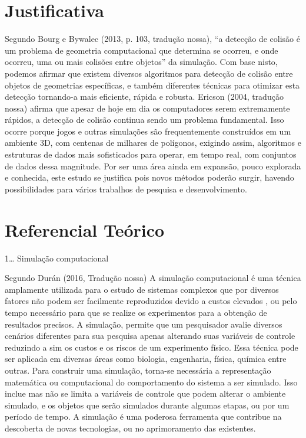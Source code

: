 \section{Justificativa}

Segundo Bourg e Bywalec (2013, p. 103, tradução nossa), “a detecção de colisão é um problema de geometria computacional que determina se ocorreu, e onde ocorreu, uma ou mais colisões entre objetos” da simulação. Com base nisto, podemos afirmar que existem diversos algoritmos para detecção de colisão entre objetos de geometrias específicas, e também diferentes técnicas para otimizar esta detecção tornando-a mais eficiente, rápida e robusta.
Ericson (2004, tradução nossa) afirma que apesar de hoje em dia os computadores serem extremamente rápidos, a detecção de colisão continua sendo um problema fundamental. Isso ocorre porque jogos e outras simulações são frequentemente construídos em um ambiente 3D, com centenas de milhares de polígonos, exigindo assim, algoritmos e estruturas de dados mais sofisticados para operar, em tempo real, com conjuntos de dados dessa magnitude.
Por ser uma área ainda em expansão, pouco explorada e conhecida, este estudo se justifica pois novos métodos poderão surgir, havendo possibilidades para vários trabalhos de pesquisa e desenvolvimento.

\section{Referencial Teórico}


1… Simulação computacional

Segundo Durán (2016, Tradução nossa)  A simulação computacional é uma técnica amplamente utilizada para o estudo de
sistemas complexos que por diversos fatores não podem ser facilmente
reproduzidos devido a custos elevados , ou pelo tempo necessário para que se
realize os experimentos para a obtenção de resultados precisos. A simulação,
permite que um pesquisador avalie diversos cenários diferentes para sua
pesquisa apenas alterando suas variáveis de controle reduzindo a sim os custos
e os riscos de um experimento físico. Essa técnica pode ser aplicada em
diversas áreas como biologia, engenharia, física, química entre outras. Para
construir uma simulação, torna-se necessária a representação matemática ou
computacional do comportamento do sistema a ser simulado. Isso inclue mas não
se limita a variáveis de controle que podem alterar o ambiente simulado, e os
objetos que serão simulados durante algumas etapas, ou por um período de tempo.
A simulação é uma poderosa ferramenta que contribue na descoberta de novas
tecnologias, ou no aprimoramento das existentes.

